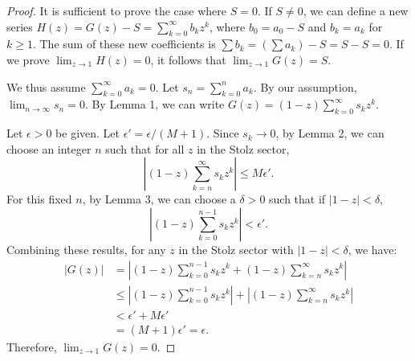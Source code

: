 \begin{proof}
It is sufficient to prove the case where $S=0$. If $S \neq 0$, we can define a new series $H(z) = G(z) - S = \sum_{k=0}^\infty b_k z^k$, where $b_0 = a_0 - S$ and $b_k = a_k$ for $k \ge 1$. The sum of these new coefficients is $\sum b_k = (\sum a_k) - S = S - S = 0$. If we prove $\lim_{z \to 1} H(z) = 0$, it follows that $\lim_{z \to 1} G(z) = S$.

We thus assume $\sum_{k=0}^{\infty} a_k = 0$. Let $s_n = \sum_{k=0}^{n} a_k$. By our assumption, $\lim_{n \to \infty} s_n = 0$. By Lemma 1, we can write $G(z) = (1-z) \sum_{k=0}^{\infty} s_k z^k$.

Let $\epsilon > 0$ be given. Let $\epsilon' = \epsilon / (M+1)$.
Since $s_k \to 0$, by Lemma 2, we can choose an integer $n$ such that for all $z$ in the Stolz sector,
$$\left| (1-z) \sum_{k=n}^{\infty} s_k z^k \right| \le M\epsilon'.$$
For this fixed $n$, by Lemma 3, we can choose a $\delta > 0$ such that if $|1-z| < \delta$,
$$\left| (1-z) \sum_{k=0}^{n-1} s_k z^k \right| < \epsilon'.$$
Combining these results, for any $z$ in the Stolz sector with $|1-z| < \delta$, we have:
\begin{align*}
|G(z)| & = \left| (1-z) \sum_{k=0}^{n-1} s_k z^k + (1-z) \sum_{k=n}^{\infty} s_k z^k \right| \\
& \le \left| (1-z) \sum_{k=0}^{n-1} s_k z^k \right| + \left| (1-z) \sum_{k=n}^{\infty} s_k z^k \right| \\
& < \epsilon' + M\epsilon' \\
& = (M+1)\epsilon' = \epsilon.
\end{align*}
Therefore, $\lim_{z \to 1} G(z) = 0$.
\end{proof}
